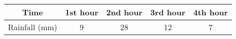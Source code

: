 \begin{center}
	\begin{tabular}{|c|c|c|c|c|}
		\hline
		Time & 1st hour & 2nd hour & 3rd hour & 4th hour \\
		\hline
		Rainfall (mm) & 9 & 28 & 12 & 7 \\
		\hline
	\end{tabular}
\end{center}